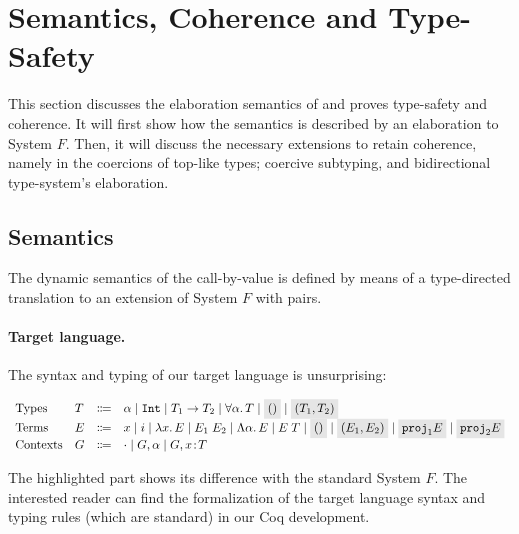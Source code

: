 \section{Semantics, Coherence and Type-Safety}
\label{sec:disjoint}
This section discusses the elaboration semantics of \name and proves
type-safety and coherence.
It will first show how the semantics is described by an elaboration to System $F$.
Then, it will discuss the necessary extensions to retain coherence, namely in the coercions of 
top-like types; coercive subtyping, and bidirectional type-system's
elaboration. 

\subsection{Semantics}
The dynamic semantics of the call-by-value \name is defined by means of
a type-directed translation to an extension of System $F$ with
pairs.

\paragraph{Target language.}
The syntax and typing of our target language is unsurprising: 

  \[
    \begin{array}{llrl}
      \text{Types}    & T & \Coloneqq & \alpha \mid \tyint \mid {T_1}
      \to {T_2} \mid \for \alpha T \mid \highlight {$()$} \mid
      \highlight {$\pair {T_1} {T_2}$} \\
      \text{Terms}    & E & \Coloneqq & x \mid i \mid \lamty x T E \mid \app {E_1} {E_2} \mid 
                                        \blam \alpha E \mid \tapp E T
                                        \mid \highlight {$()$} \mid \highlight {$ \pair {E_1} {E_2} $} 
                                        \mid \highlight {$ \proj 1 E
                                          $} \mid \highlight {$ \proj 2 E
                                          $} \\
      \text{Contexts} & G & \Coloneqq & \cdot \mid G, \alpha \mid G, x \oftype T \\
    \end{array}
  \]

The highlighted part shows its difference with the standard System $F$. 
The interested reader can find the formalization of the target language
syntax and typing rules (which are standard) in our Coq development.


